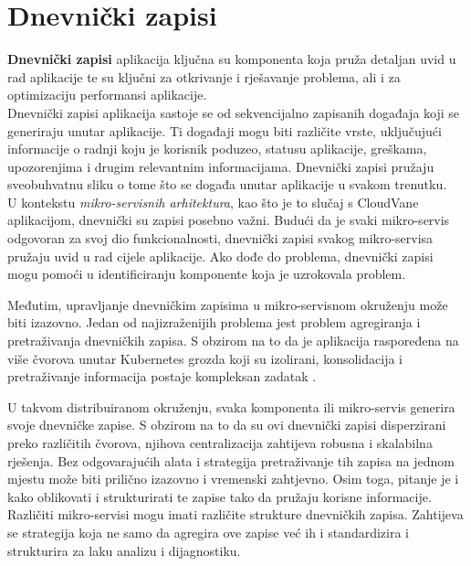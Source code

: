 \documentclass[times, utf8, diplomski]{fer}
\begin{document}
\clearpage
\section{Dnevnički zapisi}
\label{sec:logs}

\textbf{Dnevnički zapisi} aplikacija  ključna su komponenta koja pruža detaljan uvid u rad aplikacije te su ključni za otkrivanje i rješavanje problema, ali i za optimizaciju performansi aplikacije.\\

Dnevnički zapisi aplikacija sastoje se od sekvencijalno zapisanih događaja koji se generiraju unutar aplikacije. Ti događaji mogu biti različite vrste, uključujući informacije o radnji koju je korisnik poduzeo, statusu aplikacije, greškama, upozorenjima i drugim relevantnim informacijama. Dnevnički zapisi pružaju sveobuhvatnu sliku o tome što se događa unutar aplikacije u svakom trenutku.\\

U kontekstu \emph{mikro-servisnih arhitektura}, kao što je to slučaj s CloudVane aplikacijom, dnevnički su zapisi posebno važni. Budući da je svaki mikro-servis odgovoran za svoj dio funkcionalnosti, dnevnički zapisi svakog mikro-servisa pružaju uvid u rad cijele aplikacije. Ako dođe do problema, dnevnički zapisi mogu pomoći u identificiranju komponente koja je uzrokovala problem.

Međutim, upravljanje dnevničkim zapisima u mikro-servisnom okruženju može biti izazovno. Jedan od najizraženijih problema jest problem agregiranja i pretraživanja dnevničkih zapisa. S obzirom na to da je aplikacija raspoređena na više čvorova unutar Kubernetes grozda koji su izolirani, konsolidacija i pretraživanje informacija postaje kompleksan zadatak \citep{newman_building_2015}.

U takvom distribuiranom okruženju, svaka komponenta ili mikro-servis generira svoje dnevničke zapise. S obzirom na to da su ovi dnevnički zapisi disperzirani preko različitih čvorova, njihova centralizacija zahtijeva robusna i skalabilna rješenja. Bez odgovarajućih alata i strategija pretraživanje tih zapisa na jednom mjestu može biti prilično izazovno i vremenski zahtjevno. Osim toga, pitanje je i kako oblikovati i strukturirati te zapise tako da pružaju korisne informacije. Različiti mikro-servisi mogu imati različite strukture dnevničkih zapisa. Zahtijeva se strategija koja ne samo da agregira ove zapise već ih i standardizira i strukturira za laku analizu i dijagnostiku. \\
\end{document}
